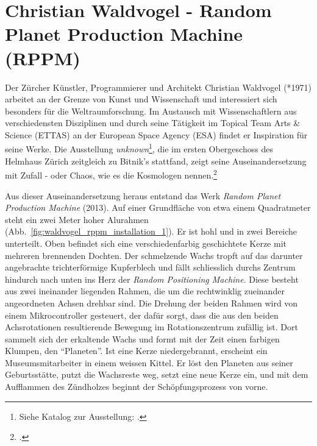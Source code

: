 \documentclass[
paper=164mm:234mm, %
pagesize, %
DIV=calc, %
10pt, %
BCOR=0mm, %
parskip=half- %
]{scrbook}
\begin{document}
{}
\section*{Christian Waldvogel - Random Planet Production Machine (RPPM)}

Der Zürcher Künstler, Programmierer und Architekt Christian Waldvogel (*1971) arbeitet an der Grenze von Kunst und Wissenschaft und interessiert sich besonders für die Weltraumforschung. Im Austausch mit Wissenschaftlern aus verschiedensten Disziplinen und durch seine Tätigkeit im Topical Team Arts \& Science (ETTAS) an der European Space Agency (ESA) findet er Inspiration für seine Werke. Die Ausstellung \emph{unknown}\footnote{Siehe Katalog zur Ausstellung: \cite{Waldvogel:2014}.}, die im ersten Obergeschoss des Helmhaus Zürich zeitgleich zu Bitnik's stattfand, zeigt seine Auseinandersetzung mit Zufall - oder Chaos, wie es die Kosmologen nennen.\footnote{\cite[7-9]{Waldvogel:2014}.}

Aus dieser Auseinandersetzung heraus entstand das Werk \emph{Random Planet Production Machine} (2013). Auf einer Grundfläche von etwa einem Quadratmeter steht ein zwei Meter hoher Alurahmen (Abb.~\ref{fig:waldvogel_rppm_installation_1}). Er ist hohl und in zwei Bereiche unterteilt. Oben befindet sich eine verschiedenfarbig geschichtete Kerze mit mehreren brennenden Dochten. Der schmelzende Wachs tropft auf das darunter angebrachte trichterförmige Kupferblech und fällt schliesslich durchs Zentrum hindurch nach unten ins Herz der \emph{Random Positioning Machine}. Diese besteht aus zwei ineinander liegenden Rahmen, die um die rechtwinklig zueinander angeordneten Achsen drehbar sind. Die Drehung der beiden Rahmen wird von einem Mikrocontroller gesteuert, der dafür sorgt, dass die aus den beiden Achsrotationen resultierende Bewegung im Rotationszentrum zufällig ist. Dort sammelt sich der erkaltende Wachs und formt mit der Zeit einen farbigen Klumpen, den \enquote{Planeten}. Ist eine Kerze niedergebrannt, erscheint ein Museumsmitarbeiter in einem weissen Kittel. Er löst den Planeten aus seiner Geburtsstätte, putzt die Wachsreste weg, setzt eine neue Kerze ein, und mit dem Aufflammen des Zündholzes beginnt der Schöpfungsprozess von vorne.
\end{document}
